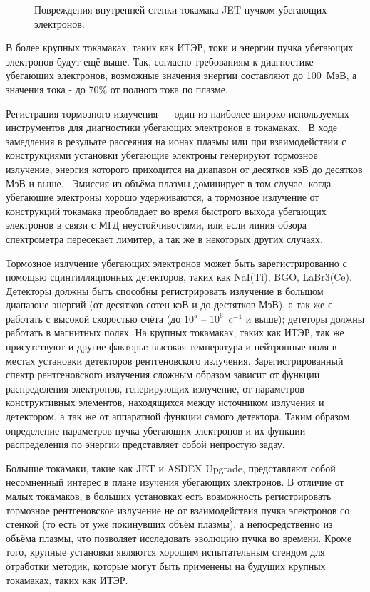 \begin{figure}[ht]
  \caption{ Повреждения внутренней стенки токамака JET пучком убегающих электронов.~\cite{Matthews2016}}
  \label{fig:electrons-wall}
\end{figure}

В более крупных токамаках, таких как ИТЭР, токи и энергии пучка убегающих электронов будут ещё выше. Так, согласно требованиям к диагностике убегающих электронов, возможные значения энергии составляют до 100~МэВ, а значения тока - до 70\% от полного тока по плазме.~\cite{Donne2007}

Регистрация тормозного излучения --- один из наиболее широко используемых инструментов для диагностики убегающих электронов в токамаках.~\cite{Breizman2019,Knoepfel1979} В ходе замедления в резульате рассеяния на ионах плазмы или при взаимодействии с конструкциями установки убегающие электроны генерируют тормозное излучение, энергия которого приходится на диапазон от десятков кэВ до десятков МэВ и выше.~\cite{Shevelev2014} Эмиссия из объёма плазмы доминирует в том случае, когда убегающие электроны хорошо удерживаются, а тормозное излучение от конструкций токамака преобладает во время быстрого выхода убегающих электронов в связи с МГД неустойчивостями, или если линия обзора спектрометра пересекает лимитер, а так же в некоторых других случаях.~\cite{Breizman2019}

Тормозное излучение убегающих электронов может быть зарегистрированно с помощью сцинтилляционных детекторов, таких как NaI(Ti), BGO, LaBr3(Ce). Детекторы должны быть способны регистрировать излучение в большом диапазоне энергий (от десятков-сотен кэВ и до дестятков МэВ), а так же с работать с высокой скоростью счёта (до $10^5$ -- $10^6$~c${}^{-1}$ и выше); дететоры должны работать в магнитных полях. На крупных токамаках, таких как ИТЭР, так же присутствуют и другие факторы: высокая температура и нейтронные поля в местах установки детекторов рентгеновского излучения. Зарегистрированный спектр рентгеновского излучения сложным образом зависит от функции распределения электронов, генерирующих излучение, от параметров конструктивных элементов, находящихся между источником излучения и детектором, а так же от аппаратной функции самого детектора. Таким образом, определение параметров пучка убегающих электронов и их функции распределения по энергии представляет собой непростую задау. 

Большие токамаки, такие как JET и ASDEX Upgrade, представляют собой несомненный интерес в плане изучения убегающих электронов. В отличие от малых токамаков, в больших установках есть возможность регистрировать тормозное рентгеновское излучение не от взаимодействия пучка электронов со стенкой (то есть от уже покинувших объём плазмы), а непосредственно из объёма плазмы, что позволяет исследовать эволюцию пучка во времени. Кроме того, крупные установки являются хорошим испытательным стендом для отработки методик, которые могут быть применены на будущих крупных токамаках, таких как ИТЭР. 


